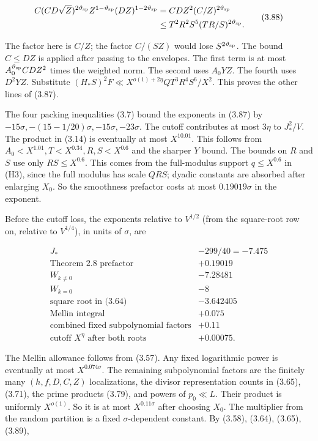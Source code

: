 \[
\begin{aligned}
C(CD\sqrt Z)^{2\vartheta_{\rm sp}}Z^{1-\vartheta_{\rm sp}}
  (DZ)^{1-2\vartheta_{\rm sp}}
 &=CDZ^2(C/Z)^{2\vartheta_{\rm sp}}\\
 &\le T^2R^2S^5(TR/S)^{2\vartheta_{\rm sp}}.
\end{aligned}
\tag{3.88}
\]

The factor here is $C/Z$; the factor $C/(SZ)$ would lose $S^{2\vartheta_{\rm sp}}$.
The bound $C\le DZ$ is applied after passing to the envelopes.
The first term is at most $A_0^{\vartheta_{\rm sp}} CDZ^2$ times the weighted norm.
The second uses $A_0YZ$. The fourth uses $D^2YZ$.
Substitute $(H_*S)^2F\ll X^{o(1)+2\eta}QT^3R^4S^6/X^2$.
This proves the other lines of (3.87).

The four packing inequalities (3.7) bound the exponents in (3.87) by
$-15\sigma,-(15-1/20)\sigma,-15\sigma,-23\sigma$.
The cutoff contributes at most $3\eta$ to $J_*^2/V$.
The product in (3.14) is eventually at most $X^{10.01}$.
This follows from $A_0<X^{1.01},T<X^{0.34},R,S<X^{0.6}$ and
the sharper $Y$ bound. The bounds on $R$ and $S$ use only
$RS\le X^{0.6}$. This comes from the full-modulus support $q\le X^{0.6}$
in (H3), since the full modulus has scale $QRS$; dyadic constants are
absorbed after enlarging $X_0$.
So the smoothness prefactor costs at most $0.19019\sigma$ in the exponent.

Before the cutoff loss, the exponents relative to
$V^{1/2}$ (from the square-root row on, relative to $V^{1/4}$), in
units of $\sigma$, are

\[
\begin{array}{c|r}
J_*&-299/40=-7.475\\
\text{Theorem 2.8 prefactor}&+0.19019\\
W_{k\ne0}&-7.28481\\
W_{k=0}&-8\\
\text{square root in (3.64)}&-3.642405\\
\text{Mellin integral}&+0.075\\
\text{combined fixed subpolynomial factors}&+0.11\\
\text{cutoff }X^\eta\text{ after both roots}&+0.00075.
\end{array}
\tag{3.89}
\]

The Mellin allowance follows from (3.57).
Any fixed logarithmic power is eventually at most $X^{0.074\sigma}$.
The remaining subpolynomial factors are the finitely many $(h,f,D,C,Z)$
localizations, the divisor representation counts in (3.65), (3.71), the
prime products (3.79), and powers of $p_0\ll L$.
Their product is uniformly $X^{o(1)}$.
So it is at most $X^{0.11\sigma}$ after choosing $X_0$.
The multiplier from the random partition is a
fixed $\sigma$-dependent constant. By
(3.58), (3.64), (3.65), (3.89),

